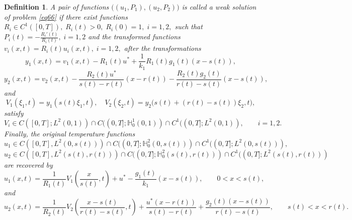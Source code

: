 \documentclass[preprint,12pt,authoryear]{elsarticle}
\newtheorem{definition}{Definition}
\begin{document}
\begin{definition}
A pair of functions $\bigl((u_1,P_1),(u_2,P_2)\bigr)$ is called a weak solution of problem \eqref{eq66} if there exist functions $R_i\in C^1([0,T]),\; R_i(t)>0,\; R_i(0)=1,\; i=1,2,$ such that $P_i(t)=-\frac{R_i'(t)}{R_i(t)},\; i=1,2$ and the transformed functions $ v_i(x,t)=R_i(t)u_i(x,t),\;i=1,2,$ after the transformations
\[
y_1(x,t)=v_1(x,t)-R_1(t)u^*+\frac{1}{k_1}R_1(t)g_1(t)(x-s(t)),
\]
\[
y_2(x,t)=v_2(x,t)-\frac{R_2(t)u^*}{s(t)-r(t)}(x-r(t))
-\frac{R_2(t)g_2(t)}{r(t)-s(t)}(x-s(t)),
\]
and
\[
V_1(\xi_1,t)=y_1(s(t)\xi_1,t),\quad V_2(\xi_2,t)=y_2\bigl(s(t)+(r(t)-s(t))\xi_2,t\bigr),
\]
satisfy
\[
V_i\in C([0,T];L^2(0,1))
\cap C((0,T];\mathbb{H}_0^1 (0,1))
\cap C^1((0,T];L^2(0,1)),
\qquad i=1,2.
\]
Finally, the original temperature functions $$u_1\in C([0,T],L^2(0,s(t)))\cap C((0,T];\mathbb{H}_0^2(0,s(t)))\cap C^1((0,T];L^2(0,s(t))),$$ 
$$u_2\in C([0,T],L^2(s(t),r(t)))\cap C((0,T];\mathbb{H}_0^2(s(t),r(t)))\cap C^1((0,T];L^2(s(t),r(t)))$$ are recovered by
\[
u_1(x,t)
=
\frac{1}{R_1(t)}
V_1\left(\frac{x}{s(t)},t\right)
+
u^*
-
\frac{g_1(t)}{k_1}(x-s(t)),
\qquad 0<x<s(t),
\]
and
\[
u_2(x,t)
=
\frac{1}{R_2(t)}
V_2\left(\frac{x-s(t)}{r(t)-s(t)},t\right)
+
\frac{u^*(x-r(t))}{s(t)-r(t)}
+
\frac{g_2(t)(x-s(t))}{r(t)-s(t)},
\qquad s(t)<x<r(t).
\]
\end{definition}
\end{document}
